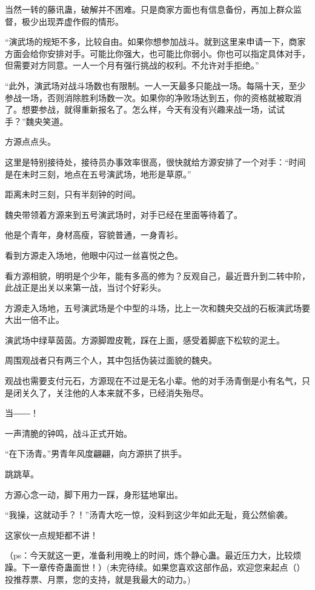 \begin{this_body}
当然一转的藤讯蛊，破解并不困难。只是商家方面也有信息备份，再加上群众监督，极少出现弄虚作假的情形。

“演武场的规矩不多，比较自由。如果你想参加战斗。就到这里来申请一下，商家方面会给你安排对手。可能比你强大，也可能比你弱小。你也可以指定具体对手，但需要对方同意。一人一个月有强行挑战的权利。不允许对手拒绝。”

“此外，演武场对战斗场数也有限制。一人一天最多只能战一场。每隔十天，至少参战一场，否则消除胜利场数一次。如果你的净败场达到五，你的资格就被取消了。想要参战，就得重新报名了。怎么样，今天有没有兴趣来战一场，试试手？”魏央笑道。

方源点点头。

这里是特别接待处，接待员办事效率很高，很快就给方源安排了一个对手：“时间是在未时三刻，地点在五号演武场，地形是草原。”

距离未时三刻，只有半刻钟的时间。

魏央带领着方源来到五号演武场时，对手已经在里面等待着了。

他是个青年，身材高瘦，容貌普通，一身青衫。

看到方源走入场地，他眼中闪过一丝喜悦之色。

看方源相貌，明明是个少年，能有多高的修为？反观自己，最近晋升到二转中阶，此战正是出关以来第一战，当讨个好彩头。

方源走入场地，五号演武场是个中型的斗场，比上一次和魏央交战的石板演武场要大出一倍不止。

演武场中绿草茵茵。方源脚蹬皮靴，踩在上面，感受着脚底下松软的泥土。

周围观战者只有两三个人，其中包括伪装过面貌的魏央。

观战也需要支付元石，方源现在不过是无名小辈。他的对手汤青倒是小有名气，只是闭关久了，关注他的人本来就不多，已经消失殆尽。

当――！

一声清脆的钟鸣，战斗正式开始。

“在下汤青。”男青年风度翩翩，向方源拱了拱手。

跳跳草。

方源心念一动，脚下用力一踩，身形猛地窜出。

“我操，这就动手？！”汤青大吃一惊，没料到这少年如此无耻，竟公然偷袭。

这家伙一点规矩都不讲！

（ps：今天就这一更，准备利用晚上的时间，炼个静心蛊。最近压力大，比较烦躁。下一章传奇蛊面世！）(未完待续。如果您喜欢这部作品，欢迎您来起点（）投推荐票、月票，您的支持，就是我最大的动力。)

\end{this_body}

